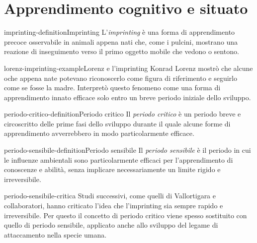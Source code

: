 \documentclass[preview]{standalone}
\begin{document}
\genpage

\section{Apprendimento cognitivo e situato}

\begin{snippetdefinition}{imprinting-definition}{Imprinting}
    L'\emph{imprinting} è una forma di apprendimento precoce osservabile in
    animali appena nati che, come i pulcini, mostrano una reazione di
    inseguimento verso il primo oggetto mobile che vedono o sentono.
\end{snippetdefinition}

\begin{snippetexample}{lorenz-imprinting-example}{Lorenz e l'imprinting}
    Konrad Lorenz mostrò che alcune oche appena nate potevano riconoscerlo come
    figura di riferimento e seguirlo come se fosse la madre. Interpretò questo
    fenomeno come una forma di apprendimento innato efficace solo entro un breve
    periodo iniziale dello sviluppo.
\end{snippetexample}


\begin{snippetdefinition}{periodo-critico-definition}{Periodo critico}
    Il \emph{periodo critico} è un periodo breve e circoscritto delle prime fasi
    dello sviluppo durante il quale alcune forme di apprendimento avverrebbero
    in modo particolarmente efficace.
\end{snippetdefinition}

\begin{snippetdefinition}{periodo-sensibile-definition}{Periodo sensibile}
    Il \emph{periodo sensibile} è il periodo in cui le influenze ambientali sono
    particolarmente efficaci per l'apprendimento di conoscenze e abilità, senza
    implicare necessariamente un limite rigido e irreversibile.
\end{snippetdefinition}

\begin{snippet}{periodo-sensibile-critica}
    Studi successivi, come quelli di Vallortigara e collaboratori, hanno
    criticato l'idea che l'imprinting sia sempre rapido e irreversibile. Per
    questo il concetto di periodo critico viene spesso sostituito con quello di
    periodo sensibile, applicato anche allo sviluppo del legame di attaccamento
    nella specie umana.
\end{snippet}
\end{document}
